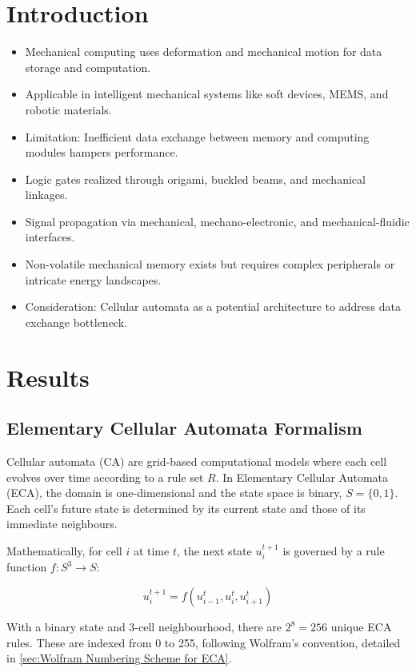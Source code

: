 \section{Introduction}
\label{sec:introduction}
\begin{itemize}
    \item Mechanical computing uses deformation and mechanical motion for data storage and computation.
    \item Applicable in intelligent mechanical systems like soft devices, MEMS, and robotic materials.
    \item Limitation: Inefficient data exchange between memory and computing modules hampers performance.
    \item Logic gates realized through origami, buckled beams, and mechanical linkages.
    \item Signal propagation via mechanical, mechano-electronic, and mechanical-fluidic interfaces.
    \item Non-volatile mechanical memory exists but requires complex peripherals or intricate energy landscapes.
    \item Consideration: Cellular automata as a potential architecture to address data exchange bottleneck.
\end{itemize}
\section{Results}

\subsection*{Elementary Cellular Automata Formalism}
Cellular automata (CA) are grid-based computational models where each cell evolves over time according to a rule set \( R \). In Elementary Cellular Automata (ECA), the domain is one-dimensional and the state space is binary, \( S = \{0, 1\} \). Each cell's future state is determined by its current state and those of its immediate neighbours.

Mathematically, for cell \( i \) at time \( t \), the next state \( u_i^{t+1} \) is governed by a rule function \( f: S^3 \to S \):

\[
u_i^{t+1} = f(u_{i-1}^t, u_i^t, u_{i+1}^t)
\]

With a binary state and 3-cell neighbourhood, there are \( 2^8 = 256 \) unique ECA rules. These are indexed from 0 to 255, following Wolfram's convention, detailed in \autoref*{sec:Wolfram Numbering Scheme for ECA}.

